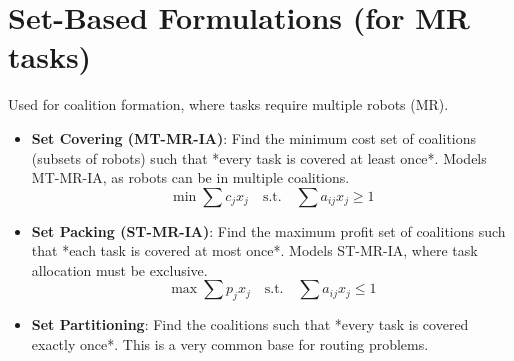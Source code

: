 \documentclass[8pt,a4paper,twocolumn]{article}
\newcommand{\0}{\mathbf{0}}
\begin{document}
\section*{Set-Based Formulations (for MR tasks)}
Used for coalition formation, where tasks require multiple robots (MR).
\begin{itemize}
    \item \textbf{Set Covering (MT-MR-IA)}: Find the minimum cost set of coalitions (subsets of robots) such that *every task is covered at least once*. Models MT-MR-IA, as robots can be in multiple coalitions.
    \[ \min \sum c_j x_j \quad \text{s.t.} \quad \sum a_{ij} x_j \ge 1 \]
    \item \textbf{Set Packing (ST-MR-IA)}: Find the maximum profit set of coalitions such that *each task is covered at most once*. Models ST-MR-IA, where task allocation must be exclusive.
    \[ \max \sum p_j x_j \quad \text{s.t.} \quad \sum a_{ij} x_j \le 1 \]
    \item \textbf{Set Partitioning}: Find the coalitions such that *every task is covered exactly once*. This is a very common base for routing problems.
\end{itemize}
\end{document}
